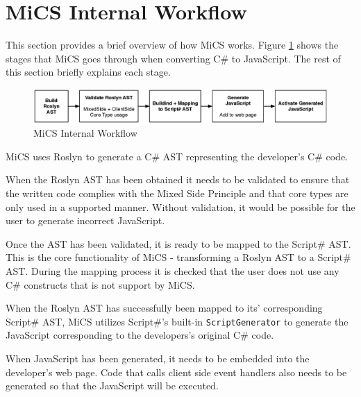 \section{MiCS Internal Workflow} %
\label{sec:workflow_overview}

This section provides a brief overview of how MiCS works. Figure \ref{fig:mics_internal_workflow} shows the stages that MiCS goes through when converting C\# to JavaScript. The rest of this section briefly explains each stage.

\begin{figure}[H]
	\begin{center}
		\centerline{\includegraphics[width=18cm]{resources/images/internalworkflow.eps}}
	\end{center}
	\caption{MiCS Internal Workflow}
	\label{fig:mics_internal_workflow}
\end{figure}

MiCS uses Roslyn to generate a C\# AST representing the developer's  C\# code. 

When the Roslyn AST has been obtained it needs to be validated to ensure that the written code complies with the Mixed Side Principle and that core types are only used in a supported manner. Without validation, it would be possible for the user to generate incorrect JavaScript.

Once the AST has been validated, it is ready to be mapped to the Script\# AST. This is the core functionality of MiCS - transforming a Roslyn AST to a Script\# AST. During the mapping process it is checked that the user does not use any C\# constructs that is not support by MiCS. 

When the Roslyn AST has successfully been mapped to its' corresponding Script\# AST, MiCS utilizes Script\#’s built-in \texttt{ScriptGenerator} to generate the JavaScript corresponding to the developers’s original C\# code. 

When JavaScript has been generated, it needs to be embedded into the developer’s web page. Code that calls client side event handlers also needs to be generated so that the JavaScript will be executed.


